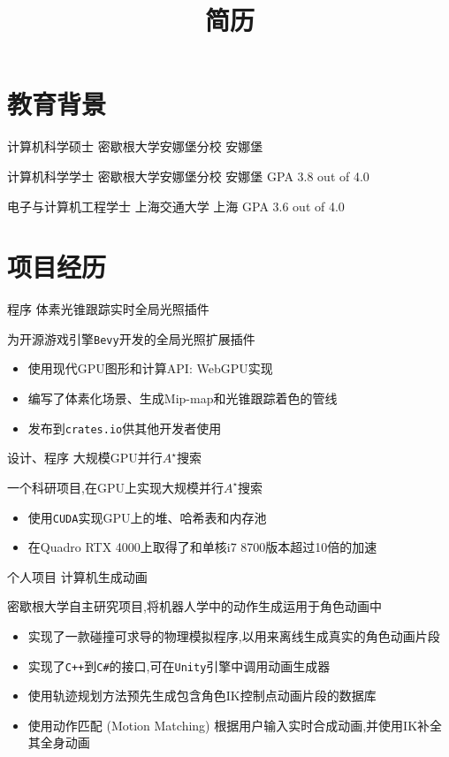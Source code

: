 \documentclass[10pt, a4paper, sans]{moderncv}
\title{简历}
\begin{document}
\makecvtitle

\section{教育背景}
{计算机科学硕士}
{密歇根大学安娜堡分校}
{安娜堡}
{}
{}

{计算机科学学士}
{密歇根大学安娜堡分校}
{安娜堡}
{GPA 3.8 out of 4.0}
{}

{电子与计算机工程学士}
{上海交通大学}
{上海}
{GPA 3.6 out of 4.0}
{}

\section{项目经历}
{程序}
{体素光锥跟踪实时全局光照插件}{}{}
{
	为开源游戏引擎\texttt{Bevy}开发的全局光照扩展插件
	\begin{itemize}
		\item 使用现代GPU图形和计算API: WebGPU实现
		\item 编写了体素化场景、生成Mip-map和光锥跟踪着色的管线
		\item 发布到\texttt{crates.io}供其他开发者使用
	\end{itemize}
}

{设计、程序}
{大规模GPU并行$A^\star$搜索}{}{}
{
	一个科研项目,在GPU上实现大规模并行$A^\star$搜索
	\begin{itemize}
		\item 使用\texttt{CUDA}实现GPU上的堆、哈希表和内存池
		\item 在Quadro RTX 4000上取得了和单核i7 8700版本超过10倍的加速
	\end{itemize}
}
{个人项目}
{计算机生成动画}
{}{}
{密歇根大学自主研究项目,将机器人学中的动作生成运用于角色动画中
	\begin{itemize}
		\item 实现了一款碰撞可求导的物理模拟程序,以用来离线生成真实的角色动画片段
		\item 实现了\texttt{C++}到\texttt{C\#}的接口,可在\texttt{Unity}引擎中调用动画生成器
		\item 使用轨迹规划方法预先生成包含角色IK控制点动画片段的数据库
		\item 使用动作匹配 (Motion Matching) 根据用户输入实时合成动画,并使用IK补全其全身动画
	\end{itemize}
}
\end{document}
